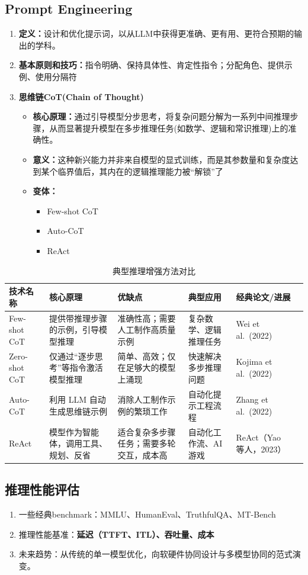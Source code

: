 \documentclass[../main.tex]{subfiles}
\begin{document}
\subsection{Prompt Engineering}
\begin{enumerate}
    \item \textbf{定义：}设计和优化提示词，以从LLM中获得更准确、更有用、更符合预期的输出的学科。
    \item \textbf{基本原则和技巧：}指令明确、保持具体性、肯定性指令；分配角色、提供示例、使用分隔符
    \item \textbf{思维链CoT(Chain of Thought)}
    \begin{itemize}
        \item \textbf{核心原理：}通过引导模型分步思考，将复杂问题分解为一系列中间推理步骤，从而显著提升模型在多步推理任务(如数学、逻辑和常识推理)上的准确性。
        \item \textbf{意义：}这种新兴能力并非来自模型的显式训练，而是其参数量和复杂度达到某个临界值后，其内在的逻辑推理能力被“解锁”了
        \item \textbf{变体：}
        \begin{itemize}
            \item Few-shot CoT
            \item Auto-CoT
            \item ReAct
        \end{itemize}
    \end{itemize}
\end{enumerate}
\begin{table}[H]
    \centering
    \caption{典型推理增强方法对比}
    \begin{tabularx}{\textwidth}{>{\centering\arraybackslash}p{2.2cm}XXXXX}
        \toprule
        技术名称 & 核心原理 & 优缺点 & 典型应用 & 经典论文/进展 \\
        \midrule
        Few-shot CoT & 提供带推理步骤的示例，引导模型推理 & 准确性高；需要人工制作高质量示例 & 复杂数学、逻辑推理任务 & Wei et al.\ (2022) \\
        
        Zero-shot CoT & 仅通过“逐步思考”等指令激活模型推理 & 简单、高效；仅在足够大的模型上涌现 & 快速解决多步推理问题 & Kojima et al.\ (2022) \\
        
        Auto-CoT & 利用 LLM 自动生成思维链示例 & 消除人工制作示例的繁琐工作 & 自动化提示工程流程 & Zhang et al.\ (2022) \\
        
        ReAct & 模型作为智能体，调用工具、规划、反省 & 适合复杂多步骤任务；需要多轮交互，成本高 & 自动化工作流、AI 游戏 & ReAct（Yao 等人，2023） \\
        \bottomrule
    \end{tabularx}
\end{table}
\subsection{推理性能评估}\label{sec:inference-performance}
\begin{enumerate}
    \item 一些经典benchmark：MMLU、HumanEval、TruthfulQA、MT-Bench
    \item 推理性能基准：\textbf{延迟（TTFT、ITL）、吞吐量、成本}
    \item 未来趋势：从传统的单一模型优化，向软硬件协同设计与多模型协同的范式演变。
\end{enumerate}
\end{document}
